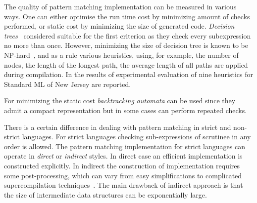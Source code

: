 \begin{comment}
\begin{figure}[ht]
\begin{minipage}[b]{0.3\linewidth}
\centering
\label{fig:figure1}
\end{minipage}
\hspace{0.5cm}
\begin{minipage}[b]{0.3\linewidth}
\centering
\begin{lstlisting}
switch x with 
| true -> 
    switch y with 
    | true -> 
       switch z with 
       | true -> 4
       | _ -> 3
    | _ -> 
      switch z with 
      | true -> 1
      | _ -> 3 
| _ -> 
   switch y with 
   | true -> 2 
   | _ -> if z then 1 else 3
\end{lstlisting}
\end{minipage}
\hspace{0.5cm}
\begin{minipage}[b]{0.3\linewidth}
\centering
\end{minipage}
\end{figure}
\end{comment}



The quality of pattern matching implementation can be measured in various ways. One can either optimise the run time cost by minimizing amount of checks performed, or static
cost by minimizing the size of generated code. \emph{Decision trees}~\cite{?} considered suitable for the first criterion as they check every subexpression no more than once.
However, minimizing the size of decision tree is known to be NP-hard~\cite{baudinet1985tree}, and as a rule various heuristics, using, for example,
the number of nodes, the length of the longest path, the average length of all paths are applied during compilation. In \cite{Scott2000WhenDM} the results of experimental
evaluation of nine heuristics for Standard ML of New Jersey are reported.

For minimizing the static cost \emph{backtracking automata} can be used since they admit a compact representation but in some cases can perform repeated checks.

There is a certain difference in dealing with pattern matching in strict and non-strict languages. For strict languages checking sub-expressions of scrutinee in any order is allowed.
The pattern matching implementation for strict languages can operate in \emph{direct} or \emph{indirect} styles. In direct case an efficient implementation is constructed
explicitly. In indirect the construction of implementation requires some post-processing, which can vary from easy simplifications to complicated supercompilation
techniques~\cite{sestoft1996}. The main drawback of indirect approach is that the size of intermediate data structures can be exponentially large.

